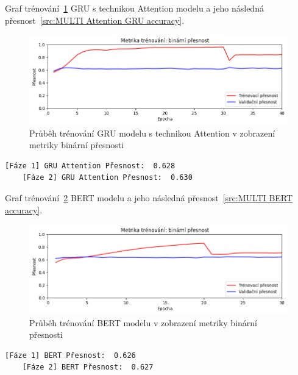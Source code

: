 Graf trénování~\ref{fig:MULTI Attention GRU model train} GRU s technikou Attention modelu a jeho následná přesnost~\ref{src:MULTI Attention GRU accuracy}.
\begin{figure}[H]
	\centering
	\includegraphics[width=1\textwidth]{Figures/MULTI_GRU_Attention_binarni_presnost.png}
	\caption{Průběh trénování GRU modelu s technikou Attention v zobrazení metriky binární přesnosti}\label{fig:MULTI Attention GRU model train}
\end{figure}
\begin{lstlisting}[label=src:MULTI Attention GRU accuracy, caption={Výsledek GRU modelu s technikou Attention na více jazyčném datasetu po trénování~\ref{fig:MULTI Attention GRU model train}}]
	[Fáze 1] GRU Attention Přesnost:  0.628
	[Fáze 2] GRU Attention Přesnost:  0.630
\end{lstlisting}

Graf trénování~\ref{fig:MULTI BERT model train} BERT modelu a jeho následná přesnost~\ref{src:MULTI BERT accuracy}.
\begin{figure}[H]
	\centering
	\includegraphics[width=1\textwidth]{Figures/MULTI_BERT_binarni_presnost.png}
	\caption{Průběh trénování BERT modelu v zobrazení metriky binární přesnosti}\label{fig:MULTI BERT model train}
\end{figure}
\begin{lstlisting}[label=src:MULTI BERT accuracy, caption={Výsledek BERT modelu na více jazyčném datasetu po trénování~\ref{fig:MULTI BERT model train}}]
	[Fáze 1] BERT Přesnost:  0.626
	[Fáze 2] BERT Přesnost:  0.627
\end{lstlisting}

